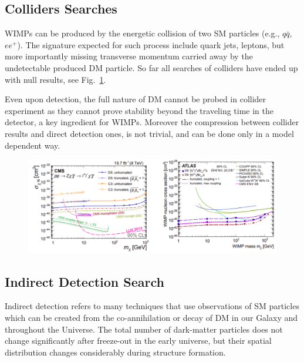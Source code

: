 \subsection{Colliders Searches}
\label{subsec:collider}

WIMPs can be produced by the energetic collision of two SM particles (e.g., $q\bar{q}$, $ee^+$). The signature expected for such process include quark jets, leptons, but more importantly missing transverse momentum carried away by the undetectable produced DM particle. So far all searches of colliders have ended up with null results, see Fig.~\ref{fig:ColliderLimit}.  

Even upon detection, the full nature of DM cannot be probed in collider experiment as they cannot prove stability beyond the traveling time in the detector, a key ingredient for WIMPs. Moreover the compression between collider results and direct detection ones, is not trivial, and can be done only in a model dependent way.
\begin{figure}[]
	\centering
	\includegraphics[width=\textwidth]{figs/ColliderLimit.png}
	\label{fig:ColliderLimit}
\end{figure}  

\subsection{Indirect Detection Search}
\label{subsec:indirect}
Indirect detection refers to many techniques that use observations
of SM particles which can be created from the co-annihilation or decay of DM in our Galaxy and throughout the Universe. The total number of dark-matter particles does not change significantly after freeze-out in the early universe, but their spatial distribution changes considerably during structure formation. 

